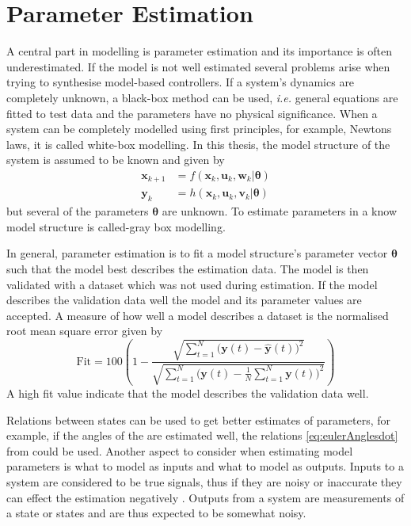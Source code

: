 \chapter{Parameter Estimation} \label{cha:parameterEstimation}
A central part in modelling is parameter estimation and its importance is often underestimated. If the model is not well estimated several problems arise when trying to synthesise model-based controllers. If a system's dynamics are completely unknown, a black-box method can be used, \emph{i.e.} general equations are fitted to test data and the parameters have no physical significance. When a system can be completely modelled using first principles, for example, Newtons laws, it is called white-box modelling. In this thesis, the model structure of the system is assumed to be known and given by
\begin{align}
\boldsymbol{x}_{k+1} &=f(\boldsymbol{x}_k,\boldsymbol{u}_k,\boldsymbol{w}_k|\boldsymbol{\theta})\\
\boldsymbol{y}_{k} &= h(\boldsymbol{x}_k,\boldsymbol{u}_k,\boldsymbol{v}_k|\boldsymbol{\theta})
\end{align}
but several of the parameters $\boldsymbol{\theta}$ are unknown.
To estimate parameters in a know model structure is called-gray box modelling. 

In general, parameter estimation is to fit a model structure's parameter vector $\boldsymbol{\theta}$ such that the model best describes the estimation data. The model is then validated with a dataset which was not used during estimation. If the model describes the validation data well the model and its parameter values are accepted. A measure of how well a model describes a dataset is the normalised root mean square error given by
\begin{equation}
\text{Fit} = 100 \left(1 - \frac{\sqrt{\sum\limits_{t=1}^N \bigr(\boldsymbol{y}(t) - \hat{\boldsymbol{y}}(t)\bigl)^2}}{\sqrt{\sum\limits_{t=1}^N \bigr(\boldsymbol{y}(t)-\frac{1}{N}\sum\limits_{t=1}^N \boldsymbol{y}(t)\bigl)^2}}\right)
\end{equation}%
A high fit value indicate that the model describes the validation data well.

Relations between states can be used to get better estimates of parameters, for example, if the angles of the \abbrROV are estimated well, the relations \eqref{eq:eulerAnglesdot} from  could be used. Another aspect to consider when estimating model parameters is what to model as inputs and what to model as outputs. Inputs to a system are considered to be true signals, thus if they are noisy or inaccurate they can effect the estimation negatively \citep{modellbygge}. Outputs from a system are measurements of a state or states and are thus expected to be somewhat noisy. 

